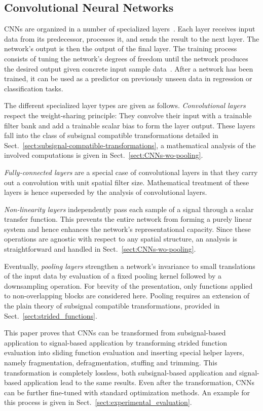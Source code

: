 \documentclass[journal]{IEEEtran}
\begin{document}
\subsection{Convolutional Neural Networks}
CNNs are organized in a number of specialized layers~\cite{LeCun1998}.
Each layer receives input data from its predecessor, processes it, and sends the result to the next layer.
The network's output is then the output of the final layer.
The training process consists of tuning the network's degrees of freedom until the network produces the desired output given concrete input sample data~\cite{Bishop1995}.
After a network has been trained, it can be used as a predictor on previously unseen data in regression or classification tasks.

The different specialized layer types are given as follows.
\emph{Convolutional layers} respect the weight-sharing principle: They convolve their input with a trainable filter bank and add a trainable scalar bias to form the layer output.
These layers fall into the class of subsignal compatible transformations detailed in Sect.~\ref{sect:subsignal-compatible-transformations}, a mathematical analysis of the involved computations is given in Sect.~\ref{sect:CNNs-wo-pooling}.

\emph{Fully-connected layers} are a special case of convolutional layers in that they carry out a convolution with unit spatial filter size.
Mathematical treatment of these layers is hence superseded by the analysis of convolutional layers.

\emph{Non-linearity layers} independently pass each sample of a signal through a scalar transfer function.
This prevents the entire network from forming a purely linear system and hence enhances the network's representational capacity.
Since these operations are agnostic with respect to any spatial structure, an analysis is straightforward and handled in Sect.~\ref{sect:CNNs-wo-pooling}.

Eventually, \emph{pooling layers} strengthen a network's invariance to small translations of the input data by evaluation of a fixed pooling kernel followed by a downsampling operation.
For brevity of the presentation, only functions applied to non-overlapping blocks are considered here.
Pooling requires an extension of the plain theory of subsignal compatible transformations, provided in Sect.~\ref{sect:strided_functions}.

This paper proves that CNNs can be transformed from subsignal-based application to signal-based application by transforming strided function evaluation into sliding function evaluation and inserting special helper layers, namely fragmentation, defragmentation, stuffing and trimming.
This transformation is completely lossless, both subsignal-based application and signal-based application lead to the same results.
Even after the transformation, CNNs can be further fine-tuned with standard optimization methods.
An example for this process is given in Sect.~\ref{sect:experimental_evaluation}.
\end{document}
